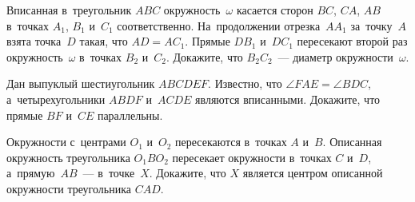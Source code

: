 \begin{problems}
\item
Вписанная в~треугольник $ABC$ окружность~$\omega$ касается
сторон $BC$, $CA$, $AB$ в~точках $A_1$, $B_1$ и~$C_1$ соответственно.
На~продолжении отрезка~$A A_1$ за~точку~$A$ взята точка~$D$ такая, что
$AD = A C_1$.
Прямые $D B_1$ и~$D C_1$ пересекают второй раз окружность~$\omega$
в~точках $B_2$ и~$C_2$.
Докажите, что $B_2 C_2$~--- диаметр окружности~$\omega$.

\item
Дан выпуклый шестиугольник $ABCDEF$.
Известно, что $\angle FAE = \angle BDC$, а~четырехугольники $ABDF$ и~$ACDE$
являются вписанными.
Докажите, что прямые $BF$ и~$CE$ параллельны.

\item
Окружности с~центрами $O_1$ и~$O_2$ пересекаются в~точках $A$ и~$B$.
Описанная окружность треугольника $O_1 B O_2$ пересекает окружности
в~точках $C$ и~$D$, а~прямую~$AB$~--- в~точке~$X$.
Докажите, что $X$ является центром описанной окружности треугольника $CAD$.

\end{problems}

